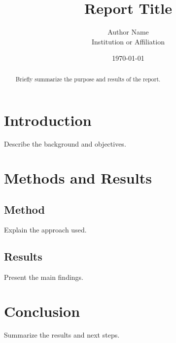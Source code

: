 \documentclass[11pt,a4paper]{report}
\title{Report Title}
\author{Author Name\\Institution or Affiliation}
\date{\today}
\begin{document}
\maketitle

\begin{abstract}
Briefly summarize the purpose and results of the report.
\end{abstract}

\tableofcontents

\chapter{Introduction}
Describe the background and objectives.

\chapter{Methods and Results}
\section{Method}
Explain the approach used.

\section{Results}
Present the main findings.

\chapter{Conclusion}
Summarize the results and next steps.
\end{document}

